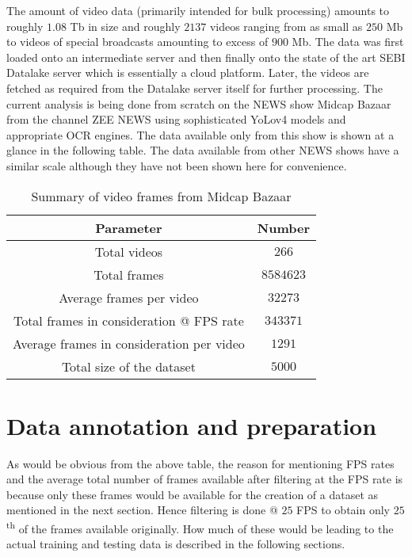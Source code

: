 The amount of video data (primarily intended for bulk processing) amounts to roughly $1.08$ Tb in size and roughly $2137$ videos ranging from as small as $250$ Mb to videos of special broadcasts amounting to excess of $900$ Mb. The data was first loaded onto an intermediate server and then finally onto the state of the art SEBI Datalake server which is essentially a cloud platform. Later, the videos are fetched as required from the Datalake server itself for further processing. The current analysis is being done from scratch on the NEWS show Midcap Bazaar from the channel ZEE NEWS using sophisticated YoLov4 models and appropriate OCR engines. The data available only from this show is shown at a glance in the following table. The data available from other NEWS shows have a similar scale although they have not been shown here for convenience.

\begin{table}[h]
  \def\arraystretch{1.5}
  \centering
  \caption{Summary of video frames from Midcap Bazaar}
  \begin{tabular}{|c|c|}
    \hline
    Parameter                                 & Number    \\
    \hline
    Total videos                              & $266$     \\
    \hline
    Total frames                              & $8584623$ \\
    \hline
    Average frames per video                  & $32273$   \\
    \hline
    Total frames in consideration @ FPS rate  & $343371$  \\
    \hline
    Average frames in consideration per video & $1291$    \\
    \hline
    Total size of the dataset                 & $5000$    \\
    \hline
  \end{tabular}
  \label{tab:vid_data_tab}
\end{table}

\section{Data annotation and preparation}

As would be obvious from the above table, the reason for mentioning FPS rates and the average total number of frames available after filtering at the FPS rate is because only these frames would be available for the creation of a dataset as mentioned in the next section. Hence filtering is done @ $25$ FPS to obtain only $25$\textsuperscript{th} of the frames available originally. How much of these would be leading to the actual training and testing data is described in the following sections. \par

